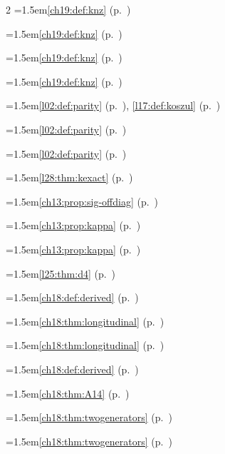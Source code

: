 \begin{multicols}{2}
\hangindent=1.5em\quad \ref{ch19:def:knz} (p.~\pageref{ch19:def:knz})\par
\hangindent=1.5em\quad \ref{ch19:def:knz} (p.~\pageref{ch19:def:knz})\par
\hangindent=1.5em\quad \ref{ch19:def:knz} (p.~\pageref{ch19:def:knz})\par
\hangindent=1.5em\quad \ref{ch19:def:knz} (p.~\pageref{ch19:def:knz})\par
\hangindent=1.5em\quad \ref{l02:def:parity} (p.~\pageref{l02:def:parity}), \ref{l17:def:koszul} (p.~\pageref{l17:def:koszul})\par
\hangindent=1.5em\quad \ref{l02:def:parity} (p.~\pageref{l02:def:parity})\par
\hangindent=1.5em\quad \ref{l02:def:parity} (p.~\pageref{l02:def:parity})\par
\hangindent=1.5em\quad \ref{l28:thm:kexact} (p.~\pageref{l28:thm:kexact})\par
\hangindent=1.5em\quad \ref{ch13:prop:sig-offdiag} (p.~\pageref{ch13:prop:sig-offdiag})\par
\hangindent=1.5em\quad \ref{ch13:prop:kappa} (p.~\pageref{ch13:prop:kappa})\par
\hangindent=1.5em\quad \ref{ch13:prop:kappa} (p.~\pageref{ch13:prop:kappa})\par
\hangindent=1.5em\quad \ref{l25:thm:d4} (p.~\pageref{l25:thm:d4})\par
\hangindent=1.5em\quad \ref{ch18:def:derived} (p.~\pageref{ch18:def:derived})\par
\hangindent=1.5em\quad \ref{ch18:thm:longitudinal} (p.~\pageref{ch18:thm:longitudinal})\par
\hangindent=1.5em\quad \ref{ch18:thm:longitudinal} (p.~\pageref{ch18:thm:longitudinal})\par
\hangindent=1.5em\quad \ref{ch18:def:derived} (p.~\pageref{ch18:def:derived})\par
\hangindent=1.5em\quad \ref{ch18:thm:A14} (p.~\pageref{ch18:thm:A14})\par
\hangindent=1.5em\quad \ref{ch18:thm:twogenerators} (p.~\pageref{ch18:thm:twogenerators})\par
\hangindent=1.5em\quad \ref{ch18:thm:twogenerators} (p.~\pageref{ch18:thm:twogenerators})\par

\end{multicols}
